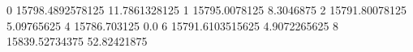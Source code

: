 0 15798.4892578125 11.7861328125
1 15795.0078125 8.3046875
2 15791.80078125 5.09765625
4 15786.703125 0.0
6 15791.6103515625 4.9072265625
8 15839.52734375 52.82421875

